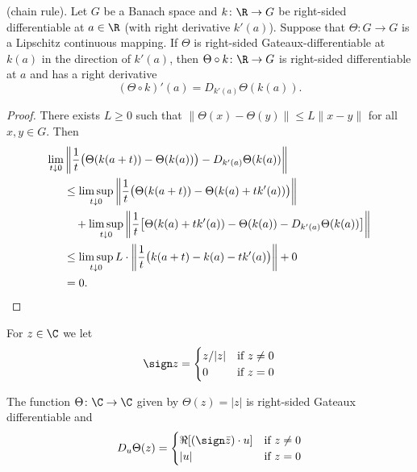 \begin{proposition} \label{prop:b2-2.3}
(chain rule). Let $G$ be a Banach space and $k \colon \R \to G$ be right-sided differentiable at $a \in \R$ (with right derivative $k'(a)$).
Suppose that $\Theta \colon G \to G$ is a Lipschitz continuous mapping.
If\/ $\Theta$ is right-sided Gateaux-differentiable at $k(a)$ in the direction of\/ $k'(a)$, then $\Theta \circ k \colon \R \to G$ is right-sided differentiable at $a$ and has a right derivative
\begin{equation}\label{eq:b2-2.4}
(\Theta \circ k)'(a) = D_{k'(a)}\Theta(k(a)).
\end{equation}
\end{proposition}
\begin{proof}
There exists $L \geq 0$ such that $\|\Theta(x) - \Theta(y)\| \leq L\|x - y\|$ for all $x,y \in G$.
Then
\[
\begin{aligned}
\lim_{t \downarrow 0} &\left\|\frac{1}{t} \bigl(\Theta(k(a+t)) - \Theta(k(a))\bigr) - D_{k'(a)}\Theta(k(a))\right\| \\
&\leq \limsup_{t \downarrow 0} \left\|\frac{1}{t} \bigl(\Theta(k(a+t)) - \Theta(k(a)+tk'(a))\bigr)\right\| \\
&\quad + \limsup_{t \downarrow 0} \left\|\frac{1}{t} \bigl[\Theta(k(a)+tk'(a)) - \Theta(k(a)) - D_{k'(a)}\Theta(k(a))\bigr]\right\| \\
&\leq \limsup_{t \downarrow 0} L \cdot \left\|\frac{1}{t} \bigl(k(a+t) - k(a)-tk'(a)\bigr)\right\| + 0 \\
&= 0.
\qedhere
\end{aligned}
\]
\end{proof}
For $z \in \C$ we let
\begin{equation}\label{eq:b2-2.5}
\sign z = \begin{cases}
    z/|z| & \text{if } z \neq 0 \\
    0 & \text{if } z = 0
\end{cases}
\end{equation}
\begin{lemma}\label{lem:b2-2.4}
The function $\Theta \colon \C \to \C$ given by $\Theta(z) = |z|$ is right-sided Gateaux differentiable and
\begin{equation}\label{eq:b2-2.6}
D_{u}\Theta(z) = \begin{cases}
    \Re[(\sign \bar{z}) \cdot u] & \text{if } z \neq 0 \\
    |u| & \text{if } z = 0
\end{cases}
\end{equation}
\end{lemma}
